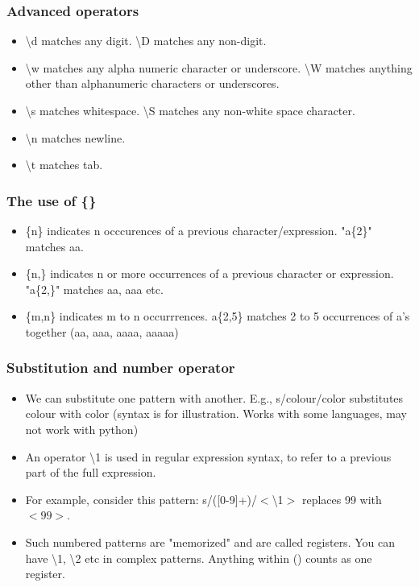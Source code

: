 \documentclass{beamer}
\begin{document}
\begin{frame}
\frametitle{Advanced operators}
\begin{itemize}
\item \textbackslash d matches any digit. \textbackslash D matches any non-digit.
\item \textbackslash w matches any alpha numeric character or underscore. \textbackslash W matches anything other than alphanumeric characters or underscores.
\item \textbackslash s matches whitespace. \textbackslash S matches any non-white space character.
\item \textbackslash n matches newline.
\item \textbackslash t matches tab. 
\end{itemize}
\end{frame}

\begin{frame}
\frametitle{The use of \{\}}
\begin{itemize}
\item \{n\} indicates n occcurences of a previous character/expression. "a\{2\}" matches aa.
\item \{n,\} indicates n or more occurrences of a previous character or expression. "a\{2,\}" matches aa, aaa etc.
\item \{m,n\} indicates m to n occurrrences. a\{2,5\} matches 2 to 5 occurrences of a's together (aa, aaa, aaaa, aaaaa)
\end{itemize}
\end{frame}

\begin{frame}
\frametitle{Substitution and number operator}
\begin{itemize}
\item We can substitute one pattern with another. E.g., s/colour/color substitutes colour with color (syntax is for illustration. Works with some languages, may not work with python)
\item An operator \textbackslash1 is used in regular expression syntax, to refer to a previous part of the full expression.
\item For example, consider this pattern: s/([0-9]+)/$<$\textbackslash1$>$ replaces 99 with $<99>$. 
\item Such numbered patterns are "memorized" and are called registers. You can have \textbackslash1, \textbackslash2 etc in complex patterns. Anything within () counts as one register.
\end{itemize}
\end{frame}
\end{document}
